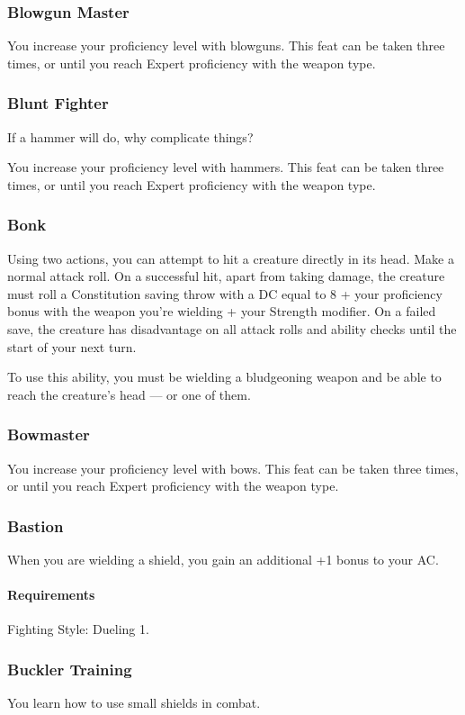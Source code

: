 \subsubsection{Blowgun Master} \label{feat::blowgunmaster}
    You increase your proficiency level with blowguns.
    This feat can be taken three times, or until you reach Expert proficiency with the weapon type.
\subsubsection{Blunt Fighter} \label{feat::bluntfighter}
    If a hammer will do, why complicate things?

    You increase your proficiency level with hammers.
    This feat can be taken three times, or until you reach Expert proficiency with the weapon type.
\subsubsection{Bonk} \label{feat::bonk}
    Using two actions, you can attempt to hit a creature directly in its head.
    Make a normal attack roll.
    On a successful hit, apart from taking damage, the creature must roll a Constitution saving throw with a DC equal to 8 + your proficiency bonus with the weapon you're wielding + your Strength modifier.
    On a failed save, the creature has disadvantage on all attack rolls and ability checks until the start of your next turn.

    To use this ability, you must be wielding a bludgeoning weapon and be able to reach the creature's head --- or one of them.
\subsubsection{Bowmaster} \label{feat::bowmaster}
    You increase your proficiency level with bows.
    This feat can be taken three times, or until you reach Expert proficiency with the weapon type.
\subsubsection{Bastion} \label{feat::bastion}
    When you are wielding a shield, you gain an additional +1 bonus to your AC.
    \paragraph{Requirements} Fighting Style: Dueling 1.
\subsubsection{Buckler Training} \label{feat::bucklertraining}
    You learn how to use small shields in combat.
